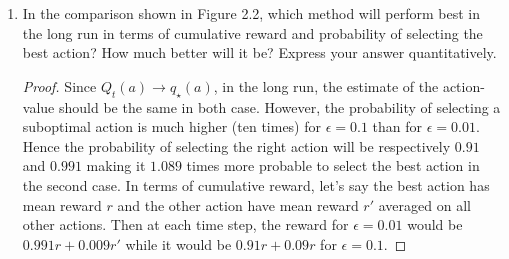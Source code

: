 \documentclass[]{book}
\theoremstyle{definition}
\newcommand{\lra}{\longrightarrow}
\begin{document}
\begin{enumerate}
    \item In the comparison shown in Figure 2.2, which method will perform best in the long run in terms of cumulative reward and probability of selecting the best action? How much better will it be? Express your answer quantitatively.
    \begin{proof}
        Since $Q_t(a) \lra q_\star(a)$, in the long run, the estimate of the action-value should be the same in both case. However, the probability of selecting a suboptimal action is much higher (ten times) for $\epsilon = 0.1$ than for $\epsilon = 0.01$. Hence the probability of selecting the right action will be respectively $0.91$ and $0.991$ making it $1.089$ times more probable to select the best action in the second case. In terms of cumulative reward, let's say the best action has mean reward $r$ and the other action have mean reward $r'$ averaged on all other actions. Then at each time step, the reward for $\epsilon = 0.01$ would be $0.991r + 0.009r'$ while it would be $0.91r + 0.09r$ for $\epsilon = 0.1$.
    \end{proof}
\end{enumerate}
\end{document}
